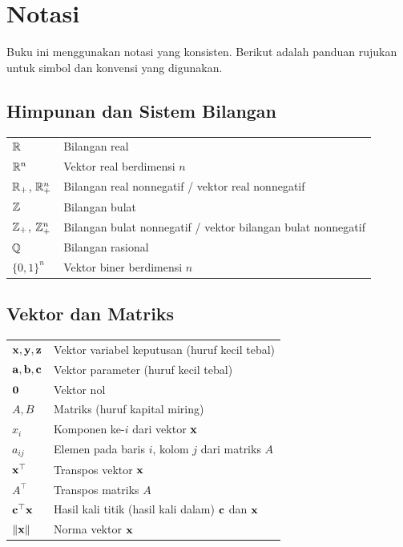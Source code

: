 
\chapter*{Notasi}

Buku ini menggunakan notasi yang konsisten. Berikut adalah panduan rujukan untuk simbol dan konvensi yang digunakan.

\section*{Himpunan dan Sistem Bilangan}

\begin{tabular}{@{}ll@{}}
${\mathbb{R}}$ & Bilangan real \\
${\mathbb{R}}^n$ & Vektor real berdimensi $n$ \\
${\mathbb{R}}_+$, ${\mathbb{R}}^n_+$ & Bilangan real nonnegatif / vektor real nonnegatif \\
${\mathbb{Z}}$ & Bilangan bulat \\
${\mathbb{Z}}_+$, ${\mathbb{Z}}^n_+$ & Bilangan bulat nonnegatif / vektor bilangan bulat nonnegatif \\
${\mathbb{Q}}$ & Bilangan rasional \\
$\{0,1\}^n$ & Vektor biner berdimensi $n$ \\
\end{tabular}

\section*{Vektor dan Matriks}

\begin{tabular}{@{}ll@{}}
$\mathbf{x}, \mathbf{y}, \mathbf{z}$ & Vektor variabel keputusan (huruf kecil tebal) \\
$\mathbf{a}, \mathbf{b}, \mathbf{c}$ & Vektor parameter (huruf kecil tebal) \\
$\mathbf{0}$ & Vektor nol \\
$A, B$ & Matriks (huruf kapital miring) \\
$x_i$ & Komponen ke-$i$ dari vektor $\mathbf{x}$ \\
$a_{ij}$ & Elemen pada baris $i$, kolom $j$ dari matriks $A$ \\
$\mathbf{x}^\top$ & Transpos vektor $\mathbf{x}$ \\
$A^\top$ & Transpos matriks $A$ \\
$\mathbf{c}^\top \mathbf{x}$ & Hasil kali titik (hasil kali dalam) $\mathbf{c}$ dan $\mathbf{x}$ \\
$\|\mathbf{x}\|$ & Norma vektor $\mathbf{x}$ \\
\end{tabular}

